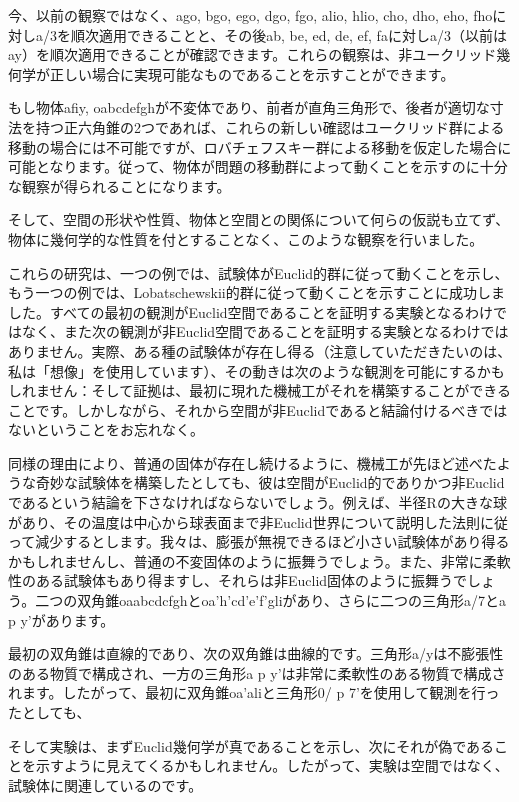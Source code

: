 \documentclass[a4paper,11pt,openany]{ltjsbook}
\begin{document}
今、以前の観察ではなく、ago, bgo, ego, dgo, fgo, alio, hlio, cho, dho, eho, fhoに対しa/3を順次適用できることと、その後ab, be, ed, de, ef, faに対しa/3（以前はay）を順次適用できることが確認できます。これらの観察は、非ユークリッド幾何学が正しい場合に実現可能なものであることを示すことができます。

もし物体afiy, oabcdefghが不変体であり、前者が直角三角形で、後者が適切な寸法を持つ正六角錐の2つであれば、これらの新しい確認はユークリッド群による移動の場合には不可能ですが、ロバチェフスキー群による移動を仮定した場合に可能となります。従って、物体が問題の移動群によって動くことを示すのに十分な観察が得られることになります。

そして、空間の形状や性質、物体と空間との関係について何らの仮説も立てず、物体に幾何学的な性質を付とすることなく、このような観察を行いました。


これらの研究は、一つの例では、試験体がEuclid的群に従って動くことを示し、もう一つの例では、Lobatschewskii的群に従って動くことを示すことに成功しました。すべての最初の観測がEuclid空間であることを証明する実験となるわけではなく、また次の観測が非Euclid空間であることを証明する実験となるわけではありません。実際、ある種の試験体が存在し得る（注意していただきたいのは、私は「想像」を使用しています）、その動きは次のような観測を可能にするかもしれません：そして証拠は、最初に現れた機械工がそれを構築することができることです。しかしながら、それから空間が非Euclidであると結論付けるべきではないということをお忘れなく。

同様の理由により、普通の固体が存在し続けるように、機械工が先ほど述べたような奇妙な試験体を構築したとしても、彼は空間がEuclid的でありかつ非Euclidであるという結論を下さなければならないでしょう。例えば、半径Rの大きな球があり、その温度は中心から球表面まで非Euclid世界について説明した法則に従って減少するとします。我々は、膨張が無視できるほど小さい試験体があり得るかもしれませんし、普通の不変固体のように振舞うでしょう。また、非常に柔軟性のある試験体もあり得ますし、それらは非Euclid固体のように振舞うでしょう。二つの双角錐oaabcdcfghとoa'h'cd'e'f'gliがあり、さらに二つの三角形a/7とa p y'があります。

最初の双角錐は直線的であり、次の双角錐は曲線的です。三角形a/yは不膨張性のある物質で構成され、一方の三角形a p y'は非常に柔軟性のある物質で構成されます。したがって、最初に双角錐oa'aliと三角形0/ p 7'を使用して観測を行ったとしても、

そして実験は、まずEuclid幾何学が真であることを示し、次にそれが偽であることを示すように見えてくるかもしれません。したがって、実験は空間ではなく、試験体に関連しているのです。
\end{document}
